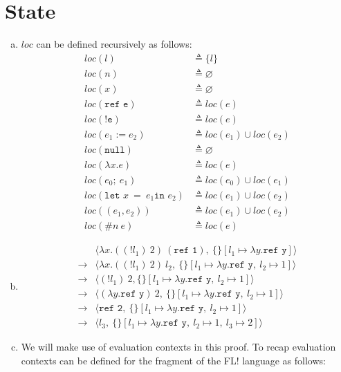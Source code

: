 \documentclass[10pt]{article}
\begin{document}
\section{State}%
\begin{enumerate} [(a)]
    \item $loc$ can be defined recursively as follows:
    \begin{align*}
      loc (l) &\triangleq \{l\}\\
      loc (n) &\triangleq \varnothing\\
      loc (x) &\triangleq \varnothing\\
      loc (\texttt{ref e}) &\triangleq loc(e)\\
      loc (\texttt{!e}) &\triangleq loc(e)\\
      loc (e_1 := e_2) &\triangleq loc(e_1) \cup loc(e_2)\\
      loc (\texttt{null}) &\triangleq \varnothing\\
      loc (\lambda x.e) &\triangleq loc(e)\\
      loc (e_0;~e_1) &\triangleq loc(e_0) \cup loc(e_1)\\
      loc (\texttt{let } x~=~e_1 \texttt{in } e_2) &\triangleq loc(e_1) \cup loc(e_2)\\
      loc ((e_1, e_2)) &\triangleq loc(e_1) \cup loc(e_2)\\
      loc (\#n~e) &\triangleq loc(e)
    \end{align*}
    \item
    \begin{align*}
    &\langle \lambda x.((!l_1)~2)~(\texttt{ref 1}),~\{\}[l_1 \mapsto \lambda y. \texttt{ref y}]\rangle\\
    \rightarrow &\langle \lambda x.((!l_1)~2)~l_2,~\{\}[l_1 \mapsto \lambda y. \texttt{ref y},~l_2 \mapsto 1]\rangle\\
    \rightarrow &\langle (!l_1)~2, \{\}[l_1 \mapsto \lambda y. \texttt{ref y},~l_2 \mapsto 1]\rangle\\
    \rightarrow &\langle (\lambda y.\texttt{ref y})~2,~\{\}[l_1 \mapsto \lambda y. \texttt{ref y},~l_2 \mapsto 1]\rangle\\
    \rightarrow &\langle \texttt{ref 2},~\{\}[l_1 \mapsto \lambda y. \texttt{ref y},~l_2 \mapsto 1]\rangle\\
    \rightarrow &\langle l_3,~\{\}[l_1 \mapsto \lambda y. \texttt{ref y},~l_2 \mapsto 1,~l_3 \mapsto 2]\rangle
    \end{align*}
    \item We will make use of evaluation contexts in this proof. To recap evaluation contexts can be defined for the fragment of the FL! language as follows:


\end{enumerate}
\end{document}
